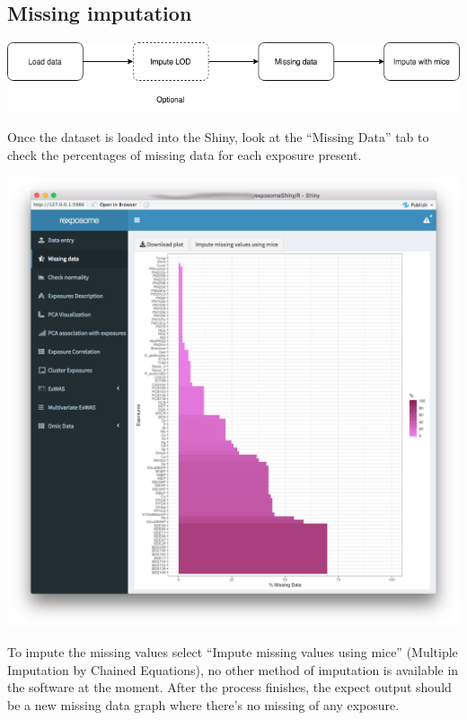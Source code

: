 \documentclass[
]{book}
\begin{document}
\hypertarget{missing-imputation}{%
\subsection{Missing imputation}\label{missing-imputation}}

\includegraphics{images/analysis2_1.png}

Once the dataset is loaded into the Shiny, look at the ``Missing Data'' tab to check the percentages of missing data for each exposure present.

\includegraphics{images/analysis2_2.png}

To impute the missing values select ``Impute missing values using mice'' (Multiple Imputation by Chained Equations), no other method of imputation is available in the software at the moment. After the process finishes, the expect output should be a new missing data graph where there's no missing of any exposure.
\end{document}
